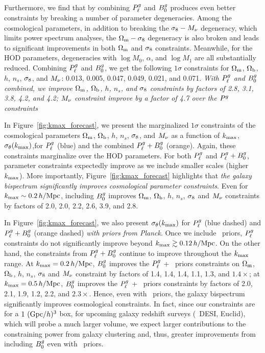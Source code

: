 Furthermore, we find that by combining $P^g_{\ell}$ and $B^g_0$ produces even better
constraints by breaking a number of parameter degeneracies. Among the cosmological 
parameters, in addition to breaking the $\sigma_8 - M_\nu$ degeneracy, which limits
power spectrum analyses, the $\Omega_{\rm m}-\sigma_8$ degeneracy is also broken and leads to
significant improvements in both $\Omega_{\rm m}$ and 
$\sigma_8$ constraints. Meanwhile, for the HOD parameters, degeneracies with 
$\log M_0$, $\alpha$, and $\log M_1$ are all substantially reduced. 
Combining $P^g_{\ell}$ and $B^g_0$, we get the following $1\sigma$ constraints for 
 $\Omega_{\rm m}$, $\Omega_{\rm b}$, $h$, $n_s$, $\sigma_8$, and $M_\nu$: 
0.013, 0.005, 0.047, 0.049, 0.021, and 0.071.
{\em With $P^g_{\ell}$ and $B^g_0$ combined, we improve $\Omega_{\rm m}$, $\Omega_{\rm b}$, $h$,
$n_s$, and $\sigma_8$ constraints by factors of 2.8, 3.1, 3.8, 4.2, and 4.2;
$M_\nu$ constraint improve by a factor of 4.7 over the $P^g$ constraints}

In Figure~\ref{fig:kmax_forecast}, we present the marginalized $1\sigma$
constraints of the cosmological parameters $\Omega_{\rm m}$, $\Omega_{\rm b}$, $h$, $n_s$, $\sigma_8$, 
and $M_\nu$ as a function of $k_{\rm max}$, $\sigma_\theta(k_{\rm max})$,for $P^g_{\ell}$
(blue) and the combined $P^g_{\ell} + B^g_0$ (orange). Again, these constraints
marginalize over the \cite{zheng2007} HOD parameters. For both $P^g_{\ell}$ and
$P^g_{\ell} + B^g_0$, parameter constraints expectedly improve as
we include smaller scales (higher $k_{\rm max}$). More importantly,
Figure~\ref{fig:kmax_forecast} highlights that {\em the galaxy bispectrum
significantly improves cosmological parameter constraints}. Even for 
$k_{\rm max}\sim 0.2\,h/\mathrm{Mpc}$, including 
$B^g_0$ improves $\Omega_{\rm m}$, $\Omega_{\rm b}$, $h$, $n_s$, $\sigma_8$ and $M_\nu$ constraints by 
factors of 2.0, 2.0, 2.2, 2.6, 3.9, and 2.8.

In Figure~\ref{fig:kmax_forecast}, we also present $\sigma_\theta(k_{\rm max})$ for
$P^g_{\ell}$ (blue dashed) and $P^g_{\ell} + B^g_0$ 
(orange dashed) {\em with priors from Planck}. Once we include \planck~priors,
$P^g_{\ell}$ constraints do not significantly improve beyond $k_{\rm max} \gtrsim 0.12\,h/\mathrm{Mpc}$.
On the other hand, the constraints from $P^g_{\ell} + B^g_0$ continue to improve 
throughout the $k_{\rm max}$ range. 
At $k_{\rm max}=0.2\,h/\mathrm{Mpc}$, $B^g_0$ improves the $P^g_{\ell}$ + \planck~priors constraints on  
$\Omega_{\rm m}$, $\Omega_{\rm b}$, $h$, $n_s$, $\sigma_8$ and $M_\nu$ constraint by factors of
1.4, 1.4, 1.4, 1.1, 1.3, and $1.4\times$;
at $k_{\rm max} = 0.5\,h/\mathrm{Mpc}$, $B^g_0$ improves the $P^g_{\ell}$ + \planck~priors constraints 
by factors of 2.0, 2.1, 1.9, 1.2, 2.2, and $2.3\times$. Hence, even with 
\planck~priors, the galaxy bispectrum significantly improves cosmological 
constraints. In fact, since our constraints are for a  $1~({\rm Gpc}/h)^3$ 
box, for upcoming
galaxy redshift surveys (\eg~DESI, Euclid), which will probe a much larger
volume, we expect larger contributions to the constraining power from galaxy 
clustering and, thus, greater improvements from including $B^g_0$ even
with \planck~priors. 


